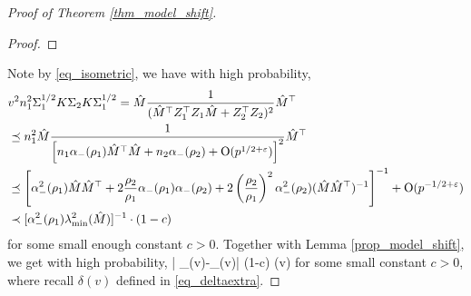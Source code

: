 \begin{proof}[Proof of Theorem \ref{thm_model_shift}]
\begin{proof}
\end{proof}
Note by \eqref{eq_isometric}, we have with high probability,
\begin{align*}
&v^2 n_1^2 \Sigma_1^{1/2} K \Sigma_2 K \Sigma_1^{1/2} = \hat M\frac{1}{(\hat M^\top Z_1^\top Z_1 \hat M + Z_2^\top Z_2)^2}\hat M^\top \\
&\preceq  n_1^2 \hat M\frac{1}{\left[n_1 \alpha_-(\rho_1)\hat M^\top \hat M + n_2 \alpha_-(\rho_2) + \operatorname{O}(p^{1/2+{\varepsilon}})\right]^2}\hat M^\top \\
&\preceq  \left[ \alpha_-^2(\rho_1) \hat M\hat M^\top + 2\frac{\rho_2}{\rho_1} \alpha_-(\rho_1)\alpha_-(\rho_2) + 2\left(\frac{\rho_2}{\rho_1}\right)^2 \alpha_-^2(\rho_2) (\hat M \hat M^\top )^{-1}\right]^{-1}+  \operatorname{O}(p^{-1/2+{\varepsilon}}) \\
&\prec [\alpha_-^2(\rho_1) \lambda_{\min}^2(\hat M)]^{-1}\cdot (1 - c)
\end{align*}
for some small enough constant $c>0$. Together with Lemma \ref{prop_model_shift}, we get with high probability,
\be\label{bounddelta-}
\left| \delta_{\bias}(v)-\wt\delta_{\bias}(v)\right| 
		\le (1-c) \delta(v)
\ee
for some small constant $c>0$, where recall $\delta(v)$ defined in \eqref{eq_deltaextra}.



\end{proof}
